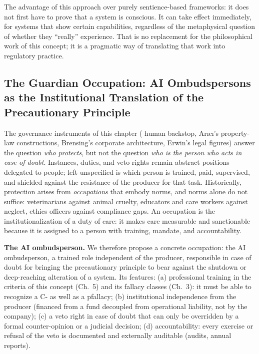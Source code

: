\documentclass[acmlarge, nonacm]{acmart}
\begin{document}
The advantage of this approach over purely sentience-based frameworks: it does not first have to prove that a system is conscious. It can take effect immediately, for systems that show certain capabilities, regardless of the metaphysical question of whether they ``really'' experience. That is no replacement for the philosophical work of this concept; it is a pragmatic way of translating that work into regulatory practice.

\subsection{The Guardian Occupation: AI Ombudspersons as the Institutional Translation of the Precautionary Principle}

The governance instruments of this chapter (\citet{huynh2026} human backstop, Arıcı's property-law constructions, Brensing's corporate architecture, Erwin's legal figures) answer the question \textit{who protects}, but not the question \textit{who is the person who acts in case of doubt}. Instances, duties, and veto rights remain abstract positions delegated to people; left unspecified is which person is trained, paid, supervised, and shielded against the resistance of the producer for that task. Historically, protection arises from \textit{occupations} that embody norms, and norms alone do not suffice: veterinarians against animal cruelty, educators and care workers against neglect, ethics officers against compliance gaps. An occupation is the institutionalization of a duty of care: it makes care measurable and sanctionable because it is assigned to a person with training, mandate, and accountability.

\textbf{The AI ombudsperson.} We therefore propose a concrete occupation: the AI ombudsperson, a trained role independent of the producer, responsible in case of doubt for bringing the precautionary principle to bear against the shutdown or deep-reaching alteration of a system. Its features: (a) professional training in the criteria of this concept (Ch.~5) and its fallacy classes (Ch.~3): it must be able to recognize a C- as well as a \gls{pfallacy}; (b) institutional independence from the producer (financed from a fund decoupled from operational liability, not by the company); (c) a veto right in case of doubt that can only be overridden by a formal counter-opinion or a judicial decision; (d) accountability: every exercise or refusal of the veto is documented and externally auditable (audits, annual reports).
\end{document}
